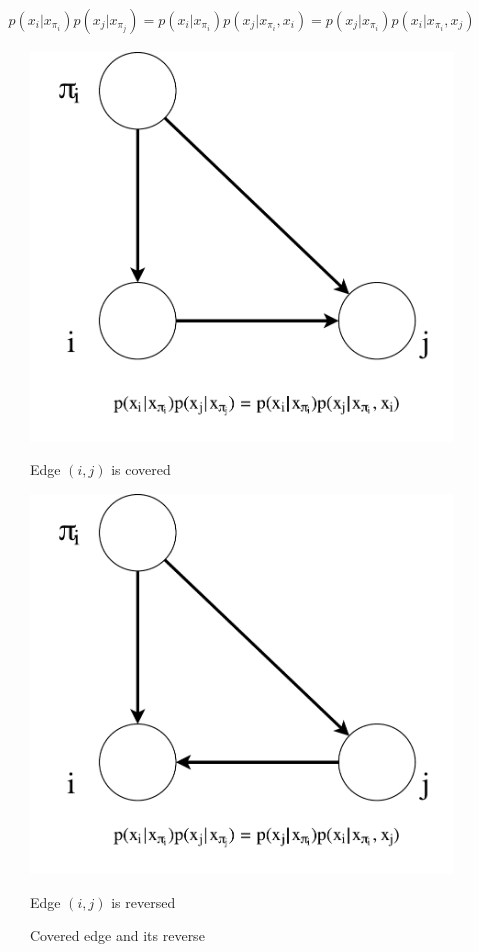 \documentclass[11pt]{article}
\numberwithin{figure}{section} %
\begin{document}
\begin{align*}
p(x_i | x_{\pi_i})p(x_j | x_{\pi_j}) = p(x_i | x_{\pi_i})p(x_j | x_{\pi_i}, x_i) = p(x_j | x_{\pi_i})p(x_i | x_{\pi_i}, x_j)\tag{P}
\end{align*}

\begin{figure}[H]
  \centering
  \begin{minipage}[b]{0.3\textwidth}
    \includegraphics[width=\textwidth]{covered_edge}
    \caption{Edge $(i,j)$ is covered}
  \end{minipage}
  \hfill
  \begin{minipage}[b]{0.3\textwidth}
    \includegraphics[width=\textwidth]{covered_edge2}
    \caption{Edge $(i,j)$ is reversed}
  \end{minipage}
	\caption{Covered edge and its reverse}
	\label{fig:cover}
\end{figure}
\end{document}
